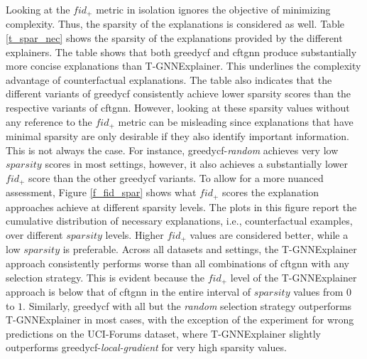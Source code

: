 Looking at the $fid_+$ metric in isolation ignores the objective of minimizing complexity. Thus, the sparsity of the explanations is considered as well. Table \ref{t_spar_nec} shows the sparsity of the explanations provided by the different explainers. The table shows that both \gls{greedycf} and \gls{cftgnn} produce substantially more concise explanations than T-GNNExplainer. This underlines the complexity advantage of counterfactual explanations. The table also indicates that the different variants of \gls{greedycf} consistently achieve lower sparsity scores than the respective variants of \gls{cftgnn}. However, looking at these sparsity values without any reference to the $fid_+$ metric can be misleading since explanations that have minimal sparsity are only desirable if they also identify important information. This is not always the case. For instance, \gls{greedycf}-\textit{random} achieves very low $sparsity$ scores in most settings, however, it also achieves a substantially lower $fid_+$ score than the other \gls{greedycf} variants. To allow for a more nuanced assessment, Figure \ref{f_fid_spar} shows what $fid_+$ scores the explanation approaches achieve at different sparsity levels. The plots in this figure report the cumulative distribution of necessary explanations, i.e., counterfactual examples, over different $sparsity$ levels. Higher $fid_+$ values are considered better, while a low $sparsity$ is preferable. Across all datasets and settings, the T-GNNExplainer approach consistently performs worse than all combinations of \gls{cftgnn} with any selection strategy. This is evident because the $fid_+$ level of the T-GNNExplainer approach is below that of \gls{cftgnn} in the entire interval of $sparsity$ values from $0$ to $1$. Similarly, \gls{greedycf} with all but the \textit{random} selection strategy outperforms T-GNNExplainer in most cases, with the exception of the experiment for wrong predictions on the UCI-Forums dataset, where T-GNNExplainer slightly outperforms \gls{greedycf}-\textit{local-gradient} for very high sparsity values.

